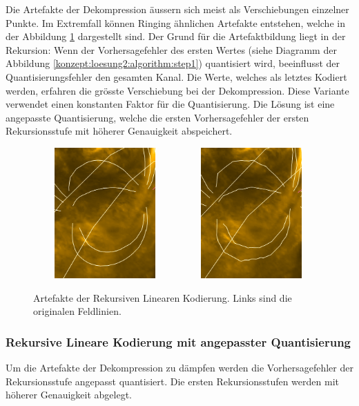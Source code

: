 Die Artefakte der Dekompression äussern sich meist als Verschiebungen einzelner Punkte. Im Extremfall können Ringing ähnlichen Artefakte entstehen, welche in der Abbildung \ref{resultate:loesung2:adaptive:median:artefakte} dargestellt sind. Der Grund für die Artefaktbildung liegt in der Rekursion: Wenn der Vorhersagefehler des ersten Wertes (siehe Diagramm der Abbildung \ref{konzept:loesung2:algorithm:step1}) quantisiert wird, beeinflusst der Quantisierungsfehler den gesamten Kanal. Die Werte, welches als letztes Kodiert werden, erfahren die grösste Verschiebung bei der Dekompression. Diese Variante verwendet einen konstanten Faktor für die Quantisierung. Die Lösung ist eine angepasste Quantisierung, welche die ersten Vorhersagefehler der ersten Rekursionsstufe mit höherer Genauigkeit abspeichert.

\begin{figure}[!htbp]
	\center
		\includegraphics[width=0.49\textwidth,height=5cm,keepaspectratio]{./pictures/resultate/loesung2/variante3/no_artifacts.png}
	\includegraphics[width=0.49\textwidth,height=5cm,keepaspectratio]{./pictures/resultate/loesung2/variante3/artifacts_8.png}
	\caption{Artefakte der Rekursiven Linearen Kodierung. Links sind die originalen Feldlinien.}
	\label{resultate:loesung2:adaptive:median:artefakte}
\end{figure}

\subsubsection{Rekursive Lineare Kodierung mit angepasster Quantisierung}
Um die Artefakte der Dekompression zu dämpfen werden die Vorhersagefehler der Rekursionsstufe angepasst quantisiert. Die ersten Rekursionsstufen werden mit höherer Genauigkeit abgelegt.

